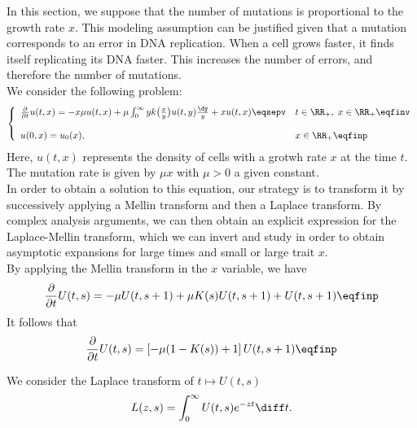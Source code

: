 In this section, we suppose that the number of mutations is proportional to the growth rate $x$. This modeling assumption can be justified given that a mutation corresponds to an error in DNA replication. When a cell grows faster, it finds itself replicating its DNA faster. This increases the number of errors, and therefore the number of mutations.\\

We consider the following problem:
\begin{equation}\left\{
    \begin{array}{ll}
	\frac{\partial}{\partial t}u(t,x) = - x\mu u(t,x) + \mu \int_{0}^{\infty} y k\big( \frac{x}{y}\big) u(t,y) \frac{\dy}{y} + xu(t,x)
	\eqsepv
	& t \in \RR_+, \; x \in \RR_+ \eqfinv
	\\ \\
	u(0, x) = u_0(x),
	& x \in \RR_+
	\eqfinp
    \end{array}
	\right.
    \label{eq:linearmutrate}
\end{equation}
Here, $u(t,x)$ represents the density of cells with a grotwh rate $x$ at the time $t$. The mutation rate is given by $\mu x$ with $\mu>0$ a given constant. \\

In order to obtain a solution to this equation, our strategy is to transform it by successively applying a Mellin transform and then a Laplace transform. By complex analysis arguments, we can then obtain an explicit expression for the Laplace-Mellin transform, which we can invert and study in order to obtain asymptotic expansions for large times and small or large trait $x$. \\

By applying the Mellin transform in the $x$ variable, we have
	\begin{equation*}
		\frac{\partial}{\partial t} U(t,s) = - \mu U(t,s+1) + \mu K(s) U(t,s+1) + U(t,s+1)
		\eqfinp
	\end{equation*}
It follows that
    \begin{equation}
        \frac{\partial}{\partial t} U(t,s) = \left[- \mu (1-K(s)) + 1\right] U(t,s+1)
		\eqfinp
        \label{eq:addgrowtheasy}
    \end{equation}

We consider the Laplace transform of $t \mapsto U(t,s)$
$$ L(z,s) = \int_0^\infty U(t,s)e^{-zt}\diff t.$$ 

